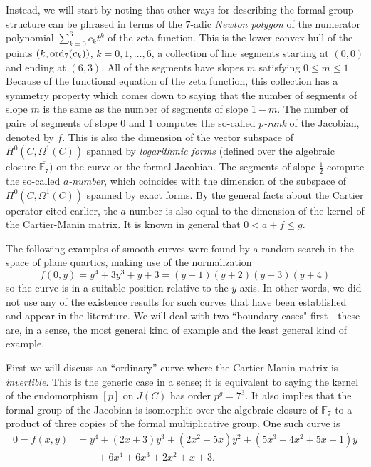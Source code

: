 \documentclass[12pt]{amsart}
\theoremstyle{theorem}
\newcommand{\FF}{\mathbb{F}}
\begin{document}
Instead, we will start by noting that other ways for describing the formal group structure
 can be phrased in terms of the $7$-adic \emph{Newton polygon} of the numerator polynomial
$\sum_{k=0}^6 c_k t^k$
of the zeta function.  This is the lower convex hull of the points $(k,{\rm ord}_7(c_k))$, $k = 0,1,\ldots,6$, 
a collection of line segments starting at $(0,0)$ and ending at $(6,3)$.  All of the segments have slopes $m$ satisfying 
$0 \le m \le 1$.  Because of the functional equation
of the zeta function, this collection has a symmetry property which comes down to saying that the 
number of segments of slope $m$ is the same as the number of segments of slope $1 - m$.  
The number of pairs of segments of slope $0$ and $1$ computes the so-called \emph{$p$-rank} of the Jacobian, denoted
by $f$.   This is also the dimension of the vector subspace of $H^0(C, \Omega^1(C))$ spanned by \emph{logarithmic forms} (defined over the algebraic
closure $\overline{\FF_7}$) on the curve or the formal Jacobian.  The segments of slope $\frac{1}{2}$ compute the so-called \emph{$a$-number}, which coincides with 
the dimension of the subspace of $H^0(C,\Omega^1(C))$ spanned by exact forms.  By the general facts about the Cartier operator
cited earlier, the $a$-number is also equal to the dimension of the kernel of the Cartier-Manin matrix.  It is known in general that $0 < a + f \le g$.
 
 The following examples of smooth curves were found
 by a random search in the space of plane quartics, making use of the normalization
 $$f(0,y) = y^4 + 3y^3 + y + 3 = (y+1)(y+2)(y+3)(y+4)$$
 so the curve is in a suitable position relative to the $y$-axis. 
  In other words, we did not use any of the existence results
 for such curves that have been established and appear in the literature.
 We will deal with two ``boundary cases" first---these are, in a sense, the most general kind of example
 and the least general kind of example.  
 
 First we will discuss an ``ordinary''  curve where the 
 Cartier-Manin matrix is \emph{invertible}.  This is the generic case in a sense;  it is equivalent to saying the 
 kernel of the endomorphism $[p]$ on $J(C)$ has order $p^g = 7^3$.   It also implies that the formal
 group of the Jacobian is isomorphic over the algebraic closure of $\FF_7$ to a product of three copies of
 the formal multiplicative group.   One such curve is 
 \begin{align*}
 0 = f(x,y) &= y^4 + (2 x + 3) y^3 + (2x^2 + 5x) y^2 + (5 x^3 + 4x^2 + 5x + 1)y\\
                &\qquad + 6x^4 + 6x^3 + 2x^2 + x + 3.
 \end{align*}
 
\end{document}
